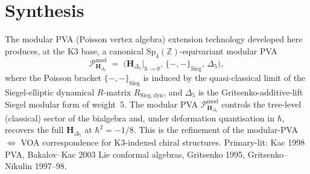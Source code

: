 \section{Synthesis}
\label{sec:modpva-ext-supplement}

\begin{remark}
\label{rem:modpva-ext-1}
The modular PVA (Poisson vertex algebra) extension technology developed
here produces, at the K3 base, a canonical $\mathrm{Sp}_4(\mathbb Z)$-equivariant
modular PVA
\[
\mathcal P_{\mathbf H_{\Delta_5}}^{\mathrm{mod}} \;=\; \bigl(\mathbf H_{\Delta_5}|_{\hbar\to 0},\, \{-,-\}_{\mathrm{Sieg}},\, \Delta_5\bigr),
\]
where the Poisson bracket $\{-,-\}_{\mathrm{Sieg}}$ is induced by the
quasi-classical limit of the Siegel-elliptic dynamical $R$-matrix
$R_{\mathrm{Sieg,dyn}}$, and $\Delta_5$ is the Gritsenko-additive-lift
Siegel modular form of weight~$5$. The modular PVA $\mathcal P_{\mathbf H_{\Delta_5}}^{\mathrm{mod}}$
controls the tree-level (classical) sector of the bialgebra
and, under deformation quantisation in $\hbar$, recovers the full
$\mathbf H_{\Delta_5}$ at $\hbar^2 = -1/8$. This is the refinement
of the modular-PVA $\Leftrightarrow$ VOA correspondence for K3-indexed
chiral structures. Primary-lit: Kac 1998 PVA, Bakalov--Kac 2003 Lie
conformal algebras, Gritsenko 1995, Gritsenko--Nikulin 1997--98.
\end{remark}
